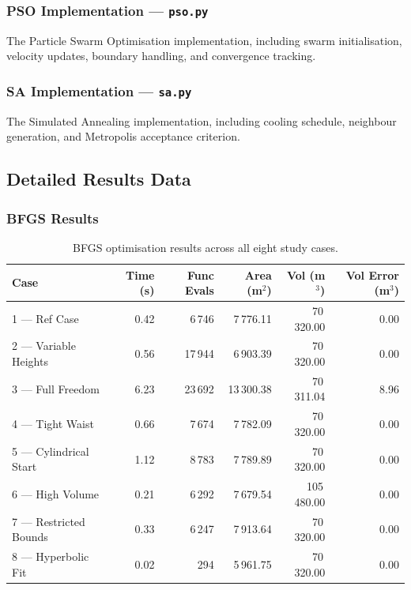 \clearpage
\subsubsection{PSO Implementation --- \texttt{pso.py}}
\label{app:pso}
The Particle Swarm Optimisation implementation, including swarm initialisation, velocity updates, boundary handling, and convergence tracking.


\clearpage
\subsubsection{SA Implementation --- \texttt{sa.py}}
\label{app:sa}
The Simulated Annealing implementation, including cooling schedule, neighbour generation, and Metropolis acceptance criterion.


\clearpage
\subsection{Detailed Results Data}

\subsubsection{BFGS Results}

\begin{table}[h!]
\centering
\caption{BFGS optimisation results across all eight study cases.}
\label{tab:bfgs_results}
\begin{tabular}{l r r r r r}
\hline
\textbf{Case} & \textbf{Time (s)} & \textbf{Func Evals} & \textbf{Area (m$^2$)} & \textbf{Vol (m$^3$)} & \textbf{Vol Error (m$^3$)} \\
\hline
1 --- Ref Case           & 0.42   & 6\,746  & 7\,776.11  & 70\,320.00  & 0.00 \\
2 --- Variable Heights   & 0.56   & 17\,944 & 6\,903.39  & 70\,320.00  & 0.00 \\
3 --- Full Freedom       & 6.23   & 23\,692 & 13\,300.38 & 70\,311.04  & 8.96 \\
4 --- Tight Waist        & 0.66   & 7\,674  & 7\,782.09  & 70\,320.00  & 0.00 \\
5 --- Cylindrical Start  & 1.12   & 8\,783  & 7\,789.89  & 70\,320.00  & 0.00 \\
6 --- High Volume        & 0.21   & 6\,292  & 7\,679.54  & 105\,480.00 & 0.00 \\
7 --- Restricted Bounds  & 0.33   & 6\,247  & 7\,913.64  & 70\,320.00  & 0.00 \\
8 --- Hyperbolic Fit     & 0.02   & 294     & 5\,961.75  & 70\,320.00  & 0.00 \\
\hline
\end{tabular}
\end{table}

